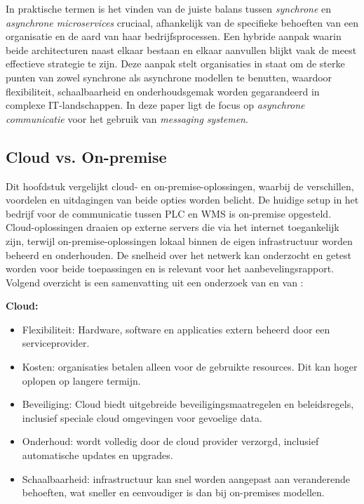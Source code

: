 In praktische termen is het vinden van de juiste balans tussen \emph{synchrone} en \emph{asynchrone microservices} cruciaal, 
afhankelijk van de specifieke behoeften van een organisatie en de aard van haar bedrijfsprocessen. 
Een hybride aanpak waarin beide architecturen naast elkaar bestaan en elkaar aanvullen blijkt vaak de meest effectieve strategie te zijn. 
Deze aanpak stelt organisaties in staat om de sterke punten van zowel synchrone als asynchrone modellen te benutten, 
waardoor flexibiliteit, schaalbaarheid en onderhoudsgemak worden gegarandeerd in complexe \newline IT-landschappen.
In deze paper ligt de focus op \emph{asynchrone communicatie} voor het gebruik van \emph{messaging systemen}.
\newline

\subsection{Cloud vs. On-premise}
Dit hoofdstuk vergelijkt cloud- en on-premise-oplossingen, waarbij de verschillen, voordelen en uitdagingen van beide opties worden belicht. 
De huidige setup in het bedrijf voor de communicatie tussen PLC en WMS is on-premise opgesteld.
Cloud-oplossingen draaien op externe servers die via het internet toegankelijk zijn, 
terwijl on-premise-oplossingen lokaal binnen de eigen infrastructuur worden beheerd en onderhouden.
De snelheid over het netwerk kan onderzocht en getest worden voor beide toepassingen en is relevant voor het aanbevelingsrapport.
Volgend overzicht is een samenvatting uit een onderzoek van \cite{Golec2021} en van \cite{Fisher2018}:

\textbf{Cloud:}
\begin{itemize}
  \item Flexibiliteit: Hardware, software en applicaties extern beheerd door een serviceprovider.
  \item Kosten: organisaties betalen alleen voor de gebruikte resources. Dit kan hoger oplopen op langere termijn. 
  \item Beveiliging: Cloud biedt uitgebreide beveiligingsmaatregelen en beleidsregels, inclusief speciale cloud omgevingen voor gevoelige data.
  \item Onderhoud: wordt volledig door de cloud provider verzorgd, inclusief automatische updates en upgrades.
  \item Schaalbaarheid: infrastructuur kan snel worden aangepast aan veranderende behoeften, wat sneller en eenvoudiger is dan bij on-premises modellen.
\end{itemize}

